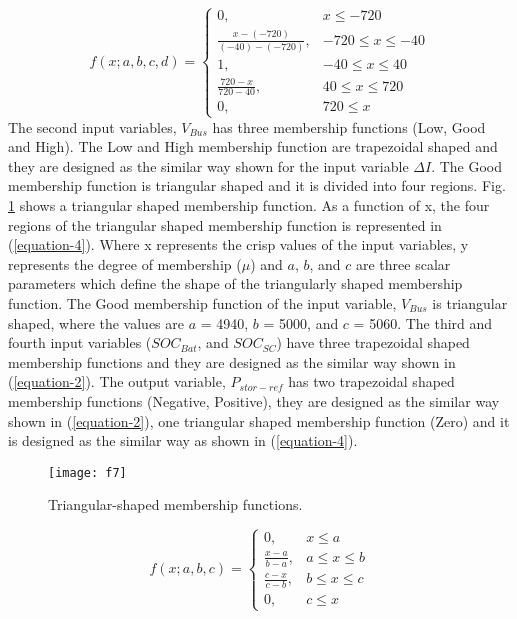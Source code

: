 \begin{equation}\label{equation-3}
f(x;a,b,c,d)=
    \begin{cases}
      0, &  x\leq -720\\
      \frac{x-(-720)}{(-40)-(-720)}, & -720\leq x \leq -40 \\
       1, & -40\leq x \leq 40 \\
       \frac{720-x}{720-40}, & 40\leq x \leq 720 \\
       0, &  720\leq x
    \end{cases}
\end{equation}
The second input variables, $V_{Bus}$ has three membership functions (Low, Good and High). The Low and High membership function are trapezoidal shaped and they are designed as the similar way shown for the input variable $\Delta I$. The Good membership function is triangular shaped and it is divided into four regions. Fig. \ref{sec4_f7} shows a triangular shaped membership function. As a function of x, the four regions of the triangular shaped membership function is represented in (\ref{equation-4}). Where x represents the crisp values of the input variables, y represents the degree of membership ($\mu$) and $a$, $b$, and $c$ are three scalar parameters which define the shape of the triangularly shaped membership function. The Good membership function of the input variable, $V_{Bus}$ is triangular shaped, where the values are $a$ = 4940, $b$ = 5000, and $c$ = 5060. The third and fourth input variables ($SOC_{Bat}$, and $SOC_{SC}$) have three trapezoidal shaped membership functions and they are designed as the similar way shown in (\ref{equation-2}). The output variable, $P_{stor-ref}$ has two trapezoidal shaped membership functions (Negative, Positive), they are designed as the similar way shown in (\ref{equation-2}), one triangular shaped membership function (Zero) and it is designed as the similar way as shown in (\ref{equation-4}). 
\begin{figure}[ht!]
\centering
\texttt{[image: f7]}
\caption{Triangular-shaped membership functions.}
\label{sec4_f7}
\end{figure}
\begin{equation}\label{equation-4}
f(x;a,b,c)=
    \begin{cases}
      0, &  x\leq a\\
      \frac{x-a}{b-a}, & a\leq x \leq b \\
       \frac{c-x}{c-b}, & b\leq x \leq c \\
       0, &  c\leq x
    \end{cases}
\end{equation}

